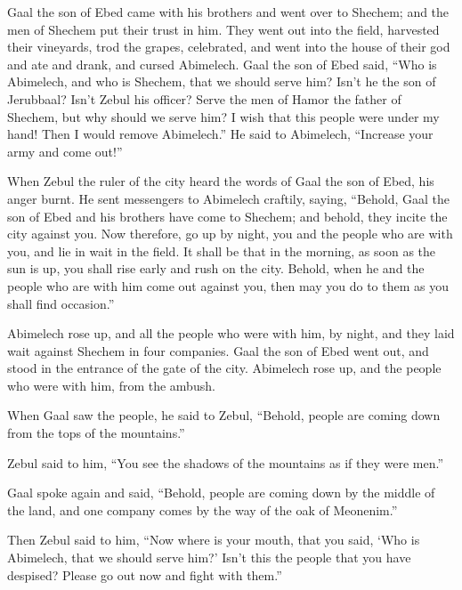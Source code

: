  Gaal the son of Ebed came with his brothers and went
over to Shechem; and the men of Shechem put their trust in him.
 They went out into the field, harvested their vineyards,
trod the grapes, celebrated, and went into the house of their god and
ate and drank, and cursed Abimelech.  Gaal the son of
Ebed said, ``Who is Abimelech, and who is Shechem, that we should serve
him? Isn't he the son of Jerubbaal? Isn't Zebul his officer? Serve the
men of Hamor the father of Shechem, but why should we serve him?
 I wish that this people were under my hand! Then I would
remove Abimelech.'' He said to Abimelech, ``Increase your army and come
out!''

 When Zebul the ruler of the city heard the words of Gaal
the son of Ebed, his anger burnt.  He sent messengers to
Abimelech craftily, saying, ``Behold, Gaal the son of Ebed and his
brothers have come to Shechem; and behold, they incite the city against
you.  Now therefore, go up by night, you and the people
who are with you, and lie in wait in the field.  It shall
be that in the morning, as soon as the sun is up, you shall rise early
and rush on the city. Behold, when he and the people who are with him
come out against you, then may you do to them as you shall find
occasion.''

 Abimelech rose up, and all the people who were with him,
by night, and they laid wait against Shechem in four companies.
 Gaal the son of Ebed went out, and stood in the entrance
of the gate of the city. Abimelech rose up, and the people who were with
him, from the ambush.

 When Gaal saw the people, he said to Zebul, ``Behold,
people are coming down from the tops of the mountains.''

Zebul said to him, ``You see the shadows of the mountains as if they
were men.''

 Gaal spoke again and said, ``Behold, people are coming
down by the middle of the land, and one company comes by the way of the
oak of Meonenim.''

 Then Zebul said to him, ``Now where is your mouth, that
you said, `Who is Abimelech, that we should serve him?' Isn't this the
people that you have despised? Please go out now and fight with them.''

